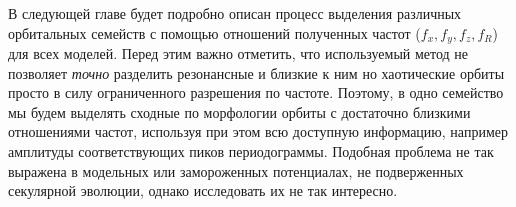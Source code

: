 \documentclass{trlnotes}
\begin{document}
В следующей главе будет подробно описан процесс выделения различных орбитальных семейств с помощью отношений
полученных частот ($f_x, f_y, f_z, f_R$) для всех моделей. Перед этим важно отметить, что используемый метод не
позволяет \emph{точно} разделить резонансные и близкие к ним но хаотические орбиты просто в силу ограниченного
разрешения по частоте. Поэтому, в одно семейство мы будем выделять сходные по морфологии орбиты с достаточно
близкими отношениями частот, используя при этом всю доступную информацию, например амплитуды соответствующих пиков
периодограммы. Подобная проблема не так выражена в модельных или замороженных потенциалах, не подверженных
секулярной эволюции\quest, однако исследовать их не так
интересно.  
\end{document}

